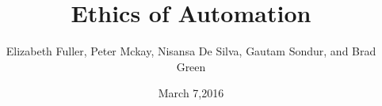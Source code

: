\title[Ethical Automation]{Ethics of Automation}
\author{Elizabeth Fuller, Peter Mckay, Nisansa De Silva, Gautam Sondur, and Brad Green
}

\date[March 7,2016]{March 7,2016}

\frame{\titlepage}

